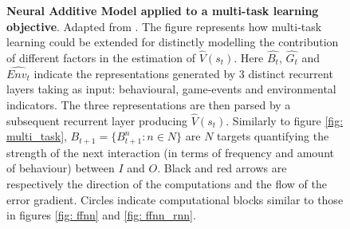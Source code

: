 \begin{figure}
\begin{center}
\begin{adjustbox}{width=0.4\textwidth}
        \end{adjustbox}
    \end{center}
\caption{\textbf{Neural Additive Model applied to a multi-task learning objective}. Adapted from \cite{bengio2017deep}. The figure represents how multi-task learning could be extended for distinctly modelling the contribution of different factors in the estimation of $\widehat{V}(s_t)$. Here $\widehat{B_t}$, $\widehat{G_t}$ and $\widehat{Env_t}$ indicate the representations generated by 3 distinct recurrent layers taking as input: behavioural, game-events and environmental indicators. The three representations are then parsed by a subsequent recurrent layer producing $\widehat{V}(s_t)$. Similarly to figure \ref{fig: multi_task}, $B_{t+1}=\{B^n_{t+1}: n \in N\}$ are $N$ targets quantifying the strength of the next interaction (in terms of frequency and amount of behaviour)  between $I$ and $O$. Black and red arrows are respectively the direction of the computations and the flow of the error gradient. Circles indicate computational blocks similar to those in figures \ref{fig: ffnn} and \ref{fig: ffnn_rnn}.}
\label{fig: nam_multi_task}
\end{figure}